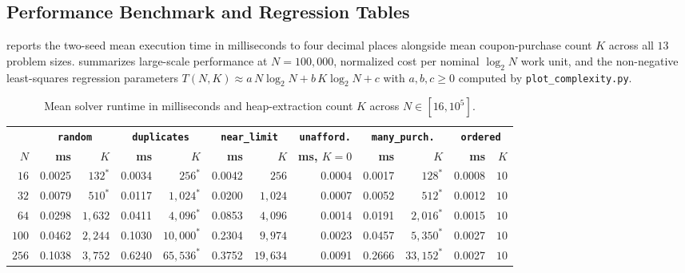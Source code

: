 \documentclass[10pt, a4paper]{article}
\newcommand{\code}[1]{\texttt{\color{primary!90!black}#1}}
\begin{document}
\subsection{Performance Benchmark and Regression Tables}
 reports the two-seed mean execution time in milliseconds to four decimal places alongside mean coupon-purchase count $K$ across all $13$ problem sizes.  summarizes large-scale performance at $N = 100{,}000$, normalized cost per nominal $\log_2 N$ work unit, and the non-negative least-squares regression parameters $T(N, K) \approx a\,N\log_2 N + b\,K\log_2 N + c$ with $a, b, c \ge 0$ computed by \code{plot\_complexity.py}.

\begin{table}[H]
\centering
\caption{Mean solver runtime in milliseconds and heap-extraction count $K$ across $N \in [16, 10^5]$.}
\label{tab:scaling}
\renewcommand{\arraystretch}{0.95}
\setlength{\tabcolsep}{3.1pt}
\footnotesize
\begin{tabular}{@{}r rr rrr rrr rrr@{}}
\toprule
& \multicolumn{2}{c}{\textbf{\color{primary}\code{random}}}
& \multicolumn{2}{c}{\textbf{\color{primary}\code{duplicates}}}
& \multicolumn{2}{c}{\textbf{\color{primary}\code{near\_limit}}}
& \multicolumn{1}{c}{\textbf{\color{primary}\code{unafford.}}}
& \multicolumn{2}{c}{\textbf{\color{primary}\code{many\_purch.}}}
& \multicolumn{2}{c}{\textbf{\color{primary}\code{ordered}}} \\
\cmidrule(lr){2-3}\cmidrule(lr){4-5}\cmidrule(lr){6-7}\cmidrule(lr){8-8}\cmidrule(lr){9-10}\cmidrule(l){11-12}
\textbf{\color{primary}$N$} & \textbf{ms} & \textbf{$K$} & \textbf{ms} & \textbf{$K$} & \textbf{ms} & \textbf{$K$} & \textbf{ms, $K\!=\!0$} & \textbf{ms} & \textbf{$K$} & \textbf{ms} & \textbf{$K$} \\
\midrule
$16$      & 0.0025 & $132^*$     & 0.0034 & $256^*$     & 0.0042 & $256$     & 0.0004 & 0.0017 & $128^*$     & 0.0008 & $10$ \\
$32$      & 0.0079 & $510^*$     & 0.0117 & $1{,}024^*$ & 0.0200 & $1{,}024$ & 0.0007 & 0.0052 & $512^*$     & 0.0012 & $10$ \\
$64$      & 0.0298 & $1{,}632$   & 0.0411 & $4{,}096^*$ & 0.0853 & $4{,}096$ & 0.0014 & 0.0191 & $2{,}016^*$ & 0.0015 & $10$ \\
$100$     & 0.0462 & $2{,}244$   & 0.1030 & $10{,}000^*$& 0.2304 & $9{,}974$ & 0.0023 & 0.0457 & $5{,}350^*$ & 0.0027 & $10$ \\
$256$     & 0.1038 & $3{,}752$   & 0.6240 & $65{,}536^*$& 0.3752 & $19{,}634$& 0.0091 & 0.2666 & $33{,}152^*$& 0.0027 & $10$ \\

\end{tabular}
\end{table}
\end{document}
